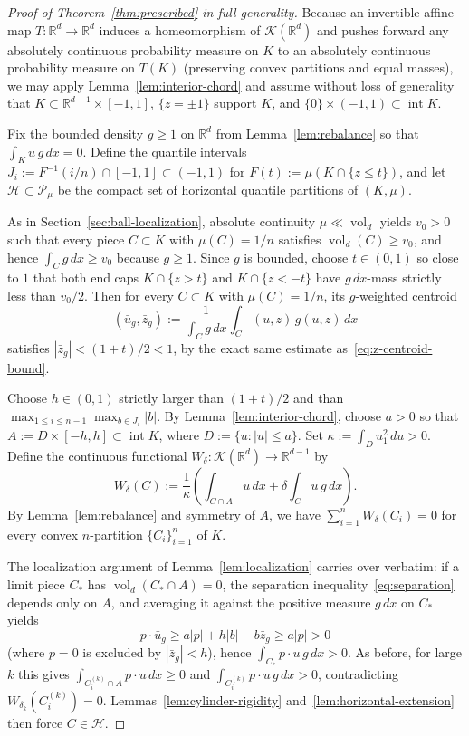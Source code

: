\documentclass[11pt,a4paper]{amsart}
\numberwithin{equation}{section}
\theoremstyle{definition}
\newcommand{\R}{\mathbb{R}}
\newcommand{\Kcal}{\mathcal{K}}
\newcommand{\Pcal}{\mathcal{P}}
\newcommand{\Hcal}{\mathcal{H}}
\newcommand{\inte}{\operatorname{int}}
\newcommand{\vol}{\operatorname{vol}}
\begin{document}
\begin{proof}[Proof of Theorem~\ref{thm:prescribed} in full generality]
Because an invertible affine map $T : \R^d \to \R^d$ induces a homeomorphism of $\Kcal(\R^d)$ and pushes forward any absolutely continuous probability measure on $K$ to an absolutely continuous probability measure on $T(K)$ (preserving convex partitions and equal masses), we may apply Lemma~\ref{lem:interior-chord} and assume without loss of generality that $K \subset \R^{d-1} \times [-1, 1]$, $\{z = \pm 1\}$ support $K$, and $\{0\} \times (-1,1) \subset \inte K$.

Fix the bounded density $g \ge 1$ on $\R^d$ from Lemma~\ref{lem:rebalance} so that $\int_K u\, g\, dx = 0$. Define the quantile intervals $J_i := F^{-1}(i/n) \cap [-1, 1] \subset (-1, 1)$ for $F(t) := \mu(K \cap \{z \le t\})$, and let $\Hcal \subset \Pcal_\mu$ be the compact set of horizontal quantile partitions of $(K, \mu)$.

As in Section~\ref{sec:ball-localization}, absolute continuity $\mu \ll \vol_d$ yields $v_0 > 0$ such that every piece $C \subset K$ with $\mu(C) = 1/n$ satisfies $\vol_d(C) \ge v_0$, and hence $\int_C g\, dx \ge v_0$ because $g \ge 1$. Since $g$ is bounded, choose $t \in (0,1)$ so close to $1$ that both end caps $K \cap \{z > t\}$ and $K \cap \{z < -t\}$ have $g\,dx$-mass strictly less than $v_0 / 2$. Then for every $C \subset K$ with $\mu(C) = 1/n$, its $g$-weighted centroid
\[
(\bar u_g, \bar z_g) := \frac{1}{\int_C g\, dx} \int_C (u, z)\, g(u, z)\, dx
\]
satisfies $|\bar z_g| < (1+t)/2 < 1$, by the exact same estimate as~\eqref{eq:z-centroid-bound}.

Choose $h \in (0,1)$ strictly larger than $(1+t)/2$ and than $\max_{1 \le i \le n-1} \max_{b \in J_i} |b|$. By Lemma~\ref{lem:interior-chord}, choose $a > 0$ so that $A := D \times [-h, h] \subset \inte K$, where $D := \{u : |u| \le a\}$. Set $\kappa := \int_D u_1^2 \, du > 0$. Define the continuous functional $W_\delta : \Kcal(\R^d) \to \R^{d-1}$ by
\[
W_\delta(C) := \frac{1}{\kappa}\left(\int_{C \cap A} u \, dx + \delta \int_C u\, g\, dx\right).
\]
By Lemma~\ref{lem:rebalance} and symmetry of $A$, we have $\sum_{i=1}^n W_\delta(C_i) = 0$ for every convex $n$-partition $\{C_i\}_{i=1}^n$ of $K$.

The localization argument of Lemma~\ref{lem:localization} carries over verbatim: if a limit piece $C_*$ has $\vol_d(C_* \cap A) = 0$, the separation inequality~\eqref{eq:separation} depends only on $A$, and averaging it against the positive measure $g\, dx$ on $C_*$ yields
\[
p \cdot \bar u_g \ge a |p| + h |b| - b \bar z_g \ge a |p| > 0
\]
(where $p = 0$ is excluded by $|\bar z_g| < h$), hence $\int_{C_*} p \cdot u\, g\, dx > 0$. As before, for large $k$ this gives $\int_{C_i^{(k)} \cap A} p \cdot u \, dx \ge 0$ and $\int_{C_i^{(k)}} p \cdot u\, g\, dx > 0$, contradicting $W_{\delta_k}(C_i^{(k)}) = 0$. Lemmas~\ref{lem:cylinder-rigidity} and~\ref{lem:horizontal-extension} then force $C \in \Hcal$.


\end{proof}
\end{document}
